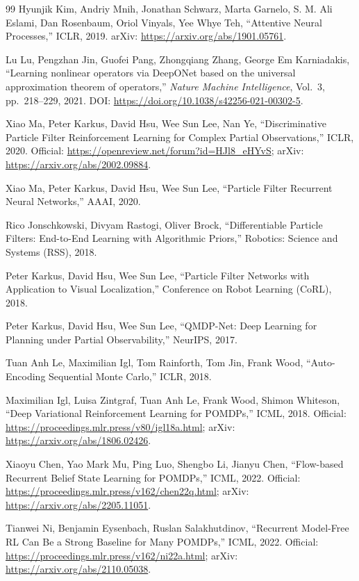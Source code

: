 \documentclass[a4paper,11pt]{article}
\begin{document}
\begin{thebibliography}{99}
Hyunjik Kim, Andriy Mnih, Jonathan Schwarz, Marta Garnelo, S. M. Ali Eslami,
Dan Rosenbaum, Oriol Vinyals, Yee Whye Teh,
``Attentive Neural Processes,'' ICLR, 2019.
arXiv: \url{https://arxiv.org/abs/1901.05761}.

Lu Lu, Pengzhan Jin, Guofei Pang, Zhongqiang Zhang, George Em Karniadakis,
``Learning nonlinear operators via DeepONet based on the universal approximation theorem of operators,''
\emph{Nature Machine Intelligence}, Vol.~3, pp.~218--229, 2021.
DOI: \url{https://doi.org/10.1038/s42256-021-00302-5}.

Xiao Ma, Peter Karkus, David Hsu, Wee Sun Lee, Nan Ye,
``Discriminative Particle Filter Reinforcement Learning for Complex Partial Observations,''
ICLR, 2020.
Official: \url{https://openreview.net/forum?id=HJl8_eHYvS};
arXiv: \url{https://arxiv.org/abs/2002.09884}.

Xiao Ma, Peter Karkus, David Hsu, Wee Sun Lee,
``Particle Filter Recurrent Neural Networks,'' AAAI, 2020.

Rico Jonschkowski, Divyam Rastogi, Oliver Brock,
``Differentiable Particle Filters: End-to-End Learning with Algorithmic Priors,''
Robotics: Science and Systems (RSS), 2018.

Peter Karkus, David Hsu, Wee Sun Lee,
``Particle Filter Networks with Application to Visual Localization,''
Conference on Robot Learning (CoRL), 2018.

Peter Karkus, David Hsu, Wee Sun Lee,
``QMDP-Net: Deep Learning for Planning under Partial Observability,''
NeurIPS, 2017.

Tuan Anh Le, Maximilian Igl, Tom Rainforth, Tom Jin, Frank Wood,
``Auto-Encoding Sequential Monte Carlo,'' ICLR, 2018.

Maximilian Igl, Luisa Zintgraf, Tuan Anh Le, Frank Wood, Shimon Whiteson,
``Deep Variational Reinforcement Learning for POMDPs,'' ICML, 2018.
Official: \url{https://proceedings.mlr.press/v80/igl18a.html};
arXiv: \url{https://arxiv.org/abs/1806.02426}.

Xiaoyu Chen, Yao Mark Mu, Ping Luo, Shengbo Li, Jianyu Chen,
``Flow-based Recurrent Belief State Learning for POMDPs,'' ICML, 2022.
Official: \url{https://proceedings.mlr.press/v162/chen22q.html};
arXiv: \url{https://arxiv.org/abs/2205.11051}.

Tianwei Ni, Benjamin Eysenbach, Ruslan Salakhutdinov,
``Recurrent Model-Free RL Can Be a Strong Baseline for Many POMDPs,'' ICML, 2022.
Official: \url{https://proceedings.mlr.press/v162/ni22a.html};
arXiv: \url{https://arxiv.org/abs/2110.05038}.


\end{thebibliography}
\end{document}
